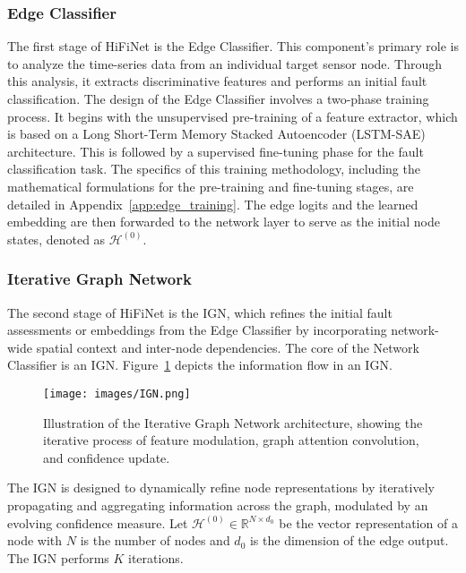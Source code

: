 \subsubsection{Edge Classifier}
The first stage of HiFiNet is the Edge Classifier. This component's primary role is to analyze the time-series data from an individual target sensor node. Through this analysis, it extracts discriminative features and performs an initial fault classification. The design of the Edge Classifier involves a two-phase training process. It begins with the unsupervised pre-training of a feature extractor, which is based on a Long Short-Term Memory Stacked Autoencoder (LSTM-SAE) architecture. This is followed by a supervised fine-tuning phase for the fault classification task. The specifics of this training methodology, including the mathematical formulations for the pre-training and fine-tuning stages, are detailed in Appendix~\ref{app:edge_training}. The edge logits and the learned embedding are then forwarded to the network layer to serve as the initial node states, denoted as \(\mathcal{H}^{(0)}\).

\subsubsection{Iterative Graph Network}
The second stage of HiFiNet is the IGN, which refines the initial fault assessments or embeddings from the Edge Classifier by incorporating network-wide spatial context and inter-node dependencies. The core of the Network Classifier is an IGN. Figure~\ref{fig:ign} depicts the information flow in an IGN.

\begin{figure}
  \centering
  \texttt{[image: images/IGN.png]}
  \caption{Illustration of the Iterative Graph Network architecture, showing the iterative process of feature modulation, graph attention convolution, and confidence update.}
  \label{fig:ign}
\end{figure}

The IGN is designed to dynamically refine node representations by iteratively propagating and aggregating information across the graph, modulated by an evolving confidence measure. Let \(\mathcal{H}^{(0)} \in \mathbb{R}^{N \times d_0}\) be the vector representation of a node with \(N\) is the number of nodes and \(d_0\) is the dimension of the edge output. The IGN performs \(K\) iterations.


